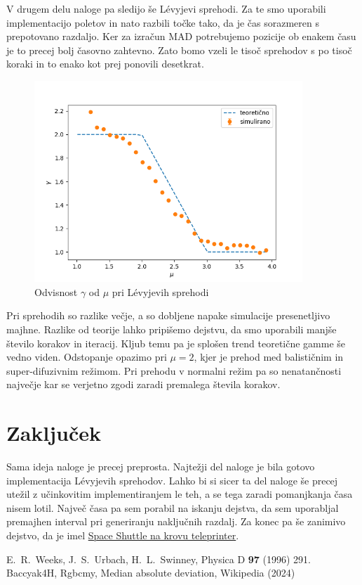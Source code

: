 \documentclass{article}
\newcommand{\MAD}{\mathrm{MAD}}
\begin{document}
V drugem delu naloge pa sledijo še L\'evyjevi sprehodi. Za te smo uporabili implementacijo poletov in nato razbili točke tako, da je čas sorazmeren s prepotovano razdaljo. Ker za izračun $\MAD$ potrebujemo pozicije ob enakem času je to precej bolj časovno zahtevno. Zato bomo vzeli le tisoč sprehodov s po tisoč koraki in to enako kot prej ponovili desetkrat.
\begin{figure}[H]
  \centering
  \includegraphics[width=0.9\textwidth]{gammamuwalks.png} 
  \caption{Odvisnost $\gamma$ od $\mu$ pri L\'evyjevih sprehodi}
\end{figure}
Pri sprehodih so razlike večje, a so dobljene napake simulacije presenetljivo majhne. Razlike od teorije lahko pripišemo dejstvu, da smo uporabili manjše število korakov in iteracij. Kljub temu pa je splošen trend teoretične gamme še vedno viden. Odstopanje opazimo pri $\mu=2$, kjer je prehod med balističnim in super-difuzivnim režimom. Pri prehodu v normalni režim pa so nenatančnosti največje kar se verjetno zgodi zaradi premalega števila korakov. 
\newpage
\section{Zaključek}
Sama ideja naloge je precej preprosta. Najtežji del naloge je bila gotovo implementacija L\'evyjevih sprehodov. Lahko bi si sicer ta del naloge še precej utežil z učinkovitim implementiranjem le teh, a se tega zaradi pomanjkanja časa nisem lotil. Največ časa pa sem porabil na iskanju dejstva, da sem uporabljal premajhen interval pri generiranju naključnih razdalj. Za konec pa še zanimivo dejstvo, da je imel \href{https://www.righto.com/2024/08/space-shuttle-interim-teleprinter.html}{Space Shuttle na krovu teleprinter}. 
\begin{thebibliography}{99}
  \setlength{\itemsep}{.2\itemsep}\setlength{\parsep}{.5\parsep}
   E.~R.~Weeks, J.~S.~Urbach, H.~L.~Swinney, Physica D {\bf 97} (1996) 291.
   Baccyak4H, Rgbcmy, Median absolute deviation, Wikipedia (2024)
\end{thebibliography}
\end{document}
